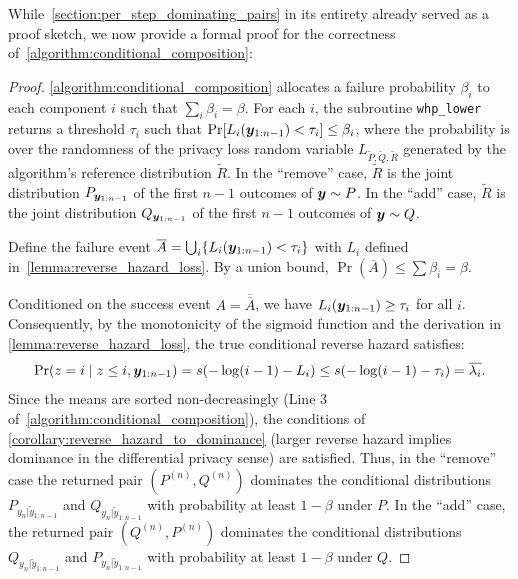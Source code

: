 While~\cref{section:per_step_dominating_pairs} in its entirety already served as a proof sketch,
we now provide a formal proof for the correctness of~\cref{algorithm:conditional_composition}:
\condcompbothcorrect*
\begin{proof}
    \cref{algorithm:conditional_composition} allocates a failure probability $\beta_i$ to each component $i$ such that $\sum_{i} \beta_i = \beta$.
    For each $i$, the subroutine \texttt{whp\_lower} returns a threshold $\tau_i$ such that $\Pr[L_i({\bm{y}}_{1:n-1}) < \tau_i] \leq \beta_i$, where the probability is over the randomness of the privacy loss random variable $L_{\tilde{P},\tilde{Q},\tilde{R}}$ generated by the algorithm's reference distribution $\tilde{R}$.
    In the ``remove'' case, $\tilde{R}$ is the joint distribution $P_{{\bm{y}}_{1:n-1}}$ of the first $n-1$ outcomes of ${\bm{y}} \sim P$.
    In the ``add'' case, $\tilde{R}$ is the joint distribution $Q_{{\bm{y}}_{1:n-1}}$ of the first $n-1$ outcomes of ${\bm{y}} \sim Q$.


    Define the failure event $\overline{A} = \bigcup_i \{ L_i({\bm{y}}_{1:n-1}) < \tau_i \}$
    with $L_i$ defined in~\cref{lemma:reverse_hazard_loss}. By a union bound, $\Pr(\overline{A}) \leq \sum \beta_i = \beta$.
    
    Conditioned on the success event $A = \overline{\overline{A}}$, we have $L_i({\bm{y}}_{1:n-1}) \geq \tau_i$ for all $i$.
    Consequently, by the monotonicity of the sigmoid function and the derivation in \cref{lemma:reverse_hazard_loss}, the true conditional reverse hazard satisfies:
    \begin{equation}
        \Pr(z=i \mid z \leq i, {\bm{y}}_{1:n-1}) = s(-\log(i-1) - L_i) \leq s(-\log(i-1) - \tau_i) = \overline{\lambda_i}.
    \end{equation}
    Since the means are sorted non-decreasingly (Line 3 of~\cref{algorithm:conditional_composition}), the conditions of \cref{corollary:reverse_hazard_to_dominance} (larger reverse hazard implies dominance in the differential privacy sense) are satisfied. Thus, in the ``remove'' case the returned pair $(P^{(n)}, Q^{(n)})$ dominates the conditional distributions $P_{y_n | \tilde{y}_{1:n-1}}$
    and $Q_{y_n | \tilde{y}_{1:n-1}}$ with probability at least $1-\beta$ under $P$.
    In the ``add'' case, the returned pair $(Q^{(n)}, P^{(n)})$ dominates the conditional distributions  $Q_{y_n | \tilde{y}_{1:n-1}}$
    and $P_{y_n | \tilde{y}_{1:n-1}}$ with probability at least $1-\beta$ under $Q$.
\end{proof}

